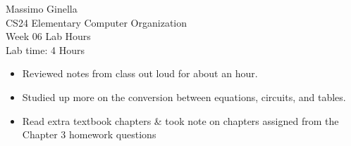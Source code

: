\documentclass[12pt]{article}
\begin{document}
	\begin{center}
		Massimo Ginella \\
		CS24 Elementary Computer Organization \\
		Week 06 Lab Hours \\
		Lab time: 4 Hours \vspace{0.5cm} \\
	\end{center}
	
	\begin{itemize}
		\item Reviewed notes from class out loud for about an hour.
		\item Studied up more on the conversion between equations, circuits, and tables. 
		\item Read extra textbook chapters \& took note on chapters assigned from the Chapter 3 homework questions
	\end{itemize}
	
	
	
\end{document}
